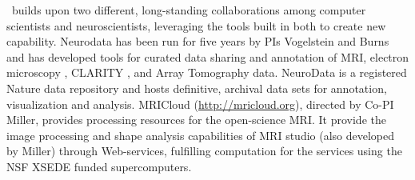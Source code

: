 
\name~builds upon two different, long-standing collaborations among 
computer scientists and neuroscientists, leveraging the tools built in both to create
new capability.  Neurodata has been run for five years by PIs Vogelstein and Burns
and has developed tools for curated data sharing and annotation of MRI, electron microscopy \cite{harris15}, 
CLARITY \cite{Chung2013a}, and Array Tomography \cite{weiler14} data.  NeuroData is a registered Nature data repository 
and hosts definitive, archival data sets for annotation, visualization and analysis.
MRICloud (\url{http://mricloud.org}), directed by Co-PI Miller, provides processing 
resources for the open-science MRI.  It provide the image processing and shape analysis 
capabilities of MRI studio 
(also developed by Miller) through Web-services, fulfilling computation for the services using 
the NSF XSEDE funded supercomputers.  



% 


